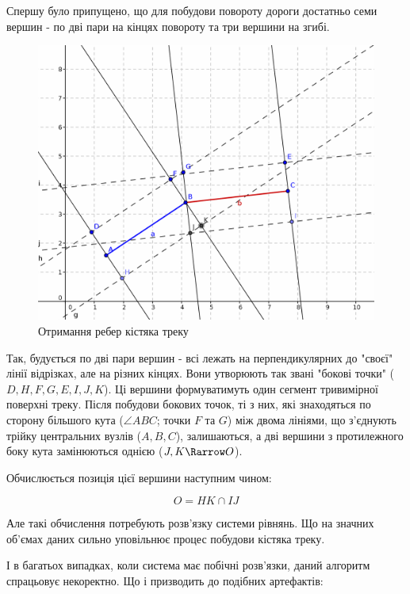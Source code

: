 \documentclass[simple,a4paper,14pt,ukrainian,utf8]{eskdtext}
\begin{document}
		Спершу було припущено, що для побудови повороту дороги достатньо семи вершин - по дві пари на кінцях повороту та три вершини на згибі.
		
		\vspace{2em}
		\begin{figure}
			\centering \includegraphics[scale=0.3]{images/perpendicular_2_1.png}
			\caption{Отримання ребер кістяка треку}
		\end{figure}
		
		Так, будується по дві пари вершин - всі лежать на перпендикулярних до "своєї" лінії відрізках, але на різних кінцях. Вони утворюють так звані "бокові точки" ($D, H, F, G, E, I, J, K$). Ці вершини формуватимуть один сегмент тривимірної поверхні треку. Після побудови бокових точок, ті з них, які знаходяться по сторону більшого кута ($\angle ABC$; точки $F$ та $G$) між двома лініями, що з’єднують трійку центральних вузлів ($A, B, C$), залишаються, а дві вершини з протилежного боку кута замінюються однією ($J, K \Rarrow O$).
		
		Обчислюється позиція цієї вершини наступним чином: 
		
		$$
			O = HK \cap IJ
		$$
		
		Але такі обчислення потребують розв’язку системи рівнянь. Що на значних об’ємах даних сильно уповільнює процес побудови кістяка треку.
		
		І в багатьох випадках, коли система має побічні розв’язки, даний алгоритм спрацьовує некоректно. Що і призводить до подібних артефактів:
		
\end{document}
